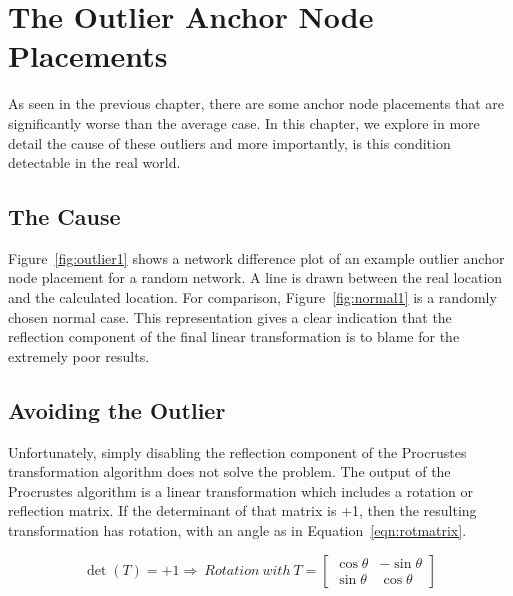 \chapter{The Outlier Anchor Node Placements}
As seen in the previous chapter, there are some anchor node placements that are significantly worse than the average case.   In this chapter, we explore in more detail the cause of these outliers and more importantly, is this condition detectable in the real world.

\section{The Cause}
Figure~\ref{fig:outlier1} shows a network difference plot of an example outlier anchor node placement for a random network. A line is drawn between the real location and the calculated location.  For comparison, Figure~\ref{fig:normal1} is a randomly chosen normal case. This representation gives a clear indication that the reflection component of the final linear transformation is to blame for the extremely poor results.  

\begin{figure}
  \centering
	\label{fig:outliernetworkdiff}
	\caption{}
\end{figure}

\section{Avoiding the Outlier}

Unfortunately, simply disabling the reflection component of the Procrustes transformation algorithm does not solve the problem.  The output of the Procrustes algorithm is a linear transformation which includes a rotation or reflection matrix.  If the determinant of that matrix is +1, then the resulting transformation has rotation, with an angle as in Equation~\ref{eqn:rotmatrix}.  

\begin{equation}
	\det{(T)}=+1 \Rightarrow ~Rotation ~with ~T=
	\begin{bmatrix}
	\cos{\theta} & -\sin{\theta} \\ 
	\sin{\theta} & \cos{\theta}\end{bmatrix}
	\label{eqn:rotmatrix} 
\end{equation}

